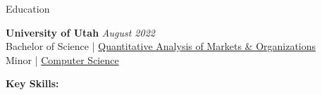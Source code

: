 \documentclass{resume/resume}
\begin{document}
\begin{rSection}{Education}

{\bf University of Utah} \hfill {\em August 2022}
\vspace{2pt}
  \\ Bachelor of Science | \href{https://eccles.utah.edu/programs/undergraduate/academics/majors/qamo/}{Quantitative Analysis of Markets \& Organizations}
  \\ Minor | \href{https://github.com/search?o=desc&q=user\%3ASpelkington&s=updated&type=Repositories}{Computer Science}

%
%
%
%
%
%
%   
%
%
%
%

%
%
{\bf Key Skills:}
\vspace{-1.83em}


\end{rSection}
\end{document}
